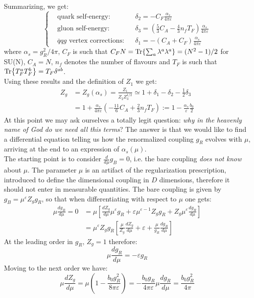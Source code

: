 \documentclass[../main.tex]{subfiles}
\begin{document}
Summarizing, we get:
\[
\left\{
\begin{aligned}
&\text{quark self-energy:}&&\delta_2=-C_F\frac{\alpha_s}{4\pi\varepsilon}\\
&\text{gluon self-energy:}&&\delta_3=\left(\frac{5}{3}C_A-\frac{4}{3}n_fT_F\right)\frac{\alpha_s}{4\pi\varepsilon}\\
&\text{$\overline{q}qg$ vertex corrections:}&&\delta_1=-(C_A+C_F)\frac{\alpha_s}{4\pi\varepsilon}
\end{aligned}
\right.
\]
where $\alpha_s=g_R^2/4\pi$, $C_F$ is such that $C_FN=\Tr{\sum_a\lambda^a\lambda^a}=(N^2-1)/2$ for SU(N), $C_A=N$, $n_f$ denotes the number of flavours and $T_F$ is such that $\Tr{T_F^aT_F^b}=T_F\delta^{ab}$.\\
Using these results and the definition of $Z_1$ we get:
\begin{align*}
Z_g&=Z_g(\alpha_s)=\frac{Z_1}{Z_2Z_3^{1/2}}\simeq1+\delta_1-\delta_2-\frac{1}{2}\delta_3\\
&=1+\frac{\alpha_s}{4\pi\varepsilon}\left(-\frac{11}{6}C_A+\frac{2}{3}n_fT_F\right):=1-\frac{\alpha_s}{\varepsilon}\frac{b_0}{2}
\end{align*}
At this point we may ask ourselves a totally legit question: \textit{why in the heavenly name of God do we need all this terms}? The answer is that we would like to find a differential equation telling us how the renormalized coupling $g_R$ evolves with $\mu$, arriving at the end to an expression of $\alpha_s(\mu)$.\\
The starting point is to consider $\frac{d}{d\mu}g_B=0$, i.e. the bare coupling \textit{does not know} about $\mu$. The parameter $\mu$ is an artifact of the regularization prescription, introduced to define the dimensional coupling in $D$ dimensions, therefore it should not enter in measurable quantities. The bare coupling is given by $g_B=\mu^\varepsilon Z_g g_R$, so that when differentiating with respect to $\mu$ one gets:
\begin{align*}
\mu\frac{dg_B}{d\mu}=0&=\mu\left[\frac{dZ_g}{d\mu}\mu^\varepsilon g_R+\varepsilon\mu^{\varepsilon-1}Z_gg_R+Z_g\mu^\varepsilon\frac{dg_R}{d\mu}\right]\\
&=\mu^\varepsilon Z_gg_R\left[\frac{\mu}{Z_g}\frac{dZ_g}{d\mu}+\varepsilon+\frac{\mu}{g_R}\frac{dg_R}{d\mu}\right]
\end{align*}
At the leading order in $g_R$, $Z_g=1$ therefore:
\[
\mu\frac{dg_R}{d\mu}=-\varepsilon g_R
\]
Moving to the next order we have:
\[
\mu\frac{dZ_g}{d\mu}=\mu\left(1-\frac{b_0g_R^2}{8\pi\varepsilon}\right)=-\frac{b_0g_R}{4\pi\varepsilon}\mu\frac{dg_R}{d\mu}=\frac{b_0g_R^2}{4\pi}
\]
\end{document}

